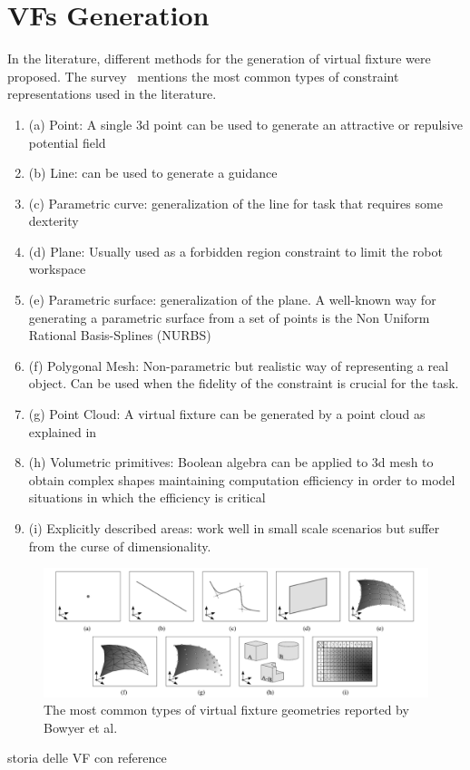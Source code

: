 \section{VFs Generation}
In the literature, different methods for the generation of virtual fixture were proposed. The survey~\cite{bowyer2014active} mentions the most common types of constraint representations used in the literature.
\begin{enumerate}
    \item (a) Point: A single 3d point can be used to generate an attractive or repulsive potential field
    \item (b) Line: can be used to generate a guidance
    \item (c) Parametric curve: generalization of the line for task that requires some dexterity
    \item (d) Plane: Usually used as a forbidden region constraint to limit the robot workspace
    \item (e) Parametric surface: generalization of the plane. A well-known way for generating a parametric surface from a set of points is the Non Uniform Rational Basis-Splines (NURBS)
    \item (f) Polygonal Mesh: Non-parametric but realistic way of representing a real object. Can be used when the fidelity of the constraint is crucial for the task.
    \item (g) Point Cloud: A virtual fixture can be generated by a point cloud as explained in~\cite{ryden2012forbidden} 
    \item (h) Volumetric primitives: Boolean algebra can be applied to 3d mesh to obtain complex shapes maintaining computation efficiency in order to model situations in which the efficiency is critical
    \item (i) Explicitly described areas: work well in small scale scenarios but suffer from the curse of dimensionality.
\end{enumerate}
\begin{figure}[H]
    \centering   \includegraphics[width=0.7\linewidth]{images/virtual_fixtures/vf_geoms.png}
    \caption{The most common types of virtual fixture geometries reported by Bowyer et al.}
    \label{fig:virtual_fixture:vf_geoms}
\end{figure}
\TODO storia delle VF con reference
\cite{selvaggio2018passive}
\cite{soldati_proposal_2020}